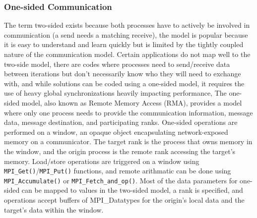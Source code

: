 \subsubsection{One-sided Communication}
The term two-sided exists because both processes have to actively be involved in communication (a send needs a matching receive), the model is popular because it is easy to understand and learn quickly but is limited by the tightly coupled nature of the communication model.
Certain applications do not map well to the two-side model, there are codes where processes need to send/receive data between iterations but don't necessarily know who they will need to exchange with, and while solutions can be coded using a one-sided model, it requires the use of heavy global synchronizations heavily impacting performance, 
The one-sided model, also known as Remote Memory Access (RMA), provides a model where only one process needs to provide the communication information, message data, message destination, and participating ranks.
One-sided operations are performed on a window, an opaque object encapsulating network-exposed memory on a communicator.
The target rank is the process that owns memory in the window, and the origin process is the remote rank accessing the target's memory.
Load/store operations are triggered on a window using \texttt{MPI\_Get()}/\texttt{MPI\_Put()} functions, and remote arithmatic can be done using \texttt{MPI\_Accumulate()} or \texttt{MPI\_Fetch\_and\_op()}.
Most of the data parameters for one-sided can be mapped to values in the two-sided model, a rank is specified, and operations accept buffers of MPI\_Datatypes for the origin's local data and the target's data within the window.

